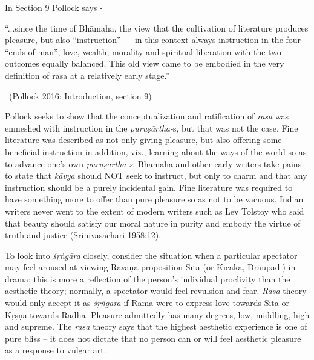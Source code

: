 In Section 9 Pollock says -

\begin{myquote}
“...since the time of Bhāmaha, the view that the cultivation of literature produces pleasure, but also “instruction” - - in this context always instruction in the four “ends of man”, love, wealth, morality and spiritual liberation with the two outcomes equally balanced. This old view came to be embodied in the very definition of rasa at a relatively early stage.” 

~\hfill (Pollock 2016: Introduction, section 9)
\end{myquote}

\newpage

Pollock seeks to show that the conceptualization and ratification of \textit{rasa} was enmeshed with instruction in the \textit{puruṣārtha-}s, but that was not the case. Fine literature was described as not only giving pleasure, but also offering some beneficial instruction in addition, viz., learning about the ways of the world so as to advance one’s own \textit{puruṣārtha-s}. Bhāmaha and other early writers take pains to state that \textit{kāvya} should NOT seek to instruct, but only to charm and that any instruction should be a purely incidental gain. Fine literature was required to have something more to offer than pure pleasure so as not to be vacuous. Indian writers never went to the extent of modern writers such as Lev Tolstoy who said that beauty should satisfy our moral nature in purity and embody the virtue of truth and justice (Srinivasachari 1958:12).

To look into \textit{śṛṅgāra} closely, consider the situation when a particular spectator may feel aroused at viewing Rāvaṇa proposition Sītā (or Kīcaka, Draupadī) in drama; this is more a reflection of the person’s individual proclivity than the aesthetic theory; normally, a spectator would feel revulsion and fear. \textit{Rasa} theory would only accept it as \textit{śṛṅgāra} if Rāma were to express love towards Sīta or Kṛṣṇa towards Rādhā. Pleasure admittedly has many degrees, low, middling, high and supreme. The \textit{rasa} theory says that the highest aesthetic experience is one of pure bliss – it does not dictate that no person can or will feel aesthetic pleasure as a response to vulgar art.

